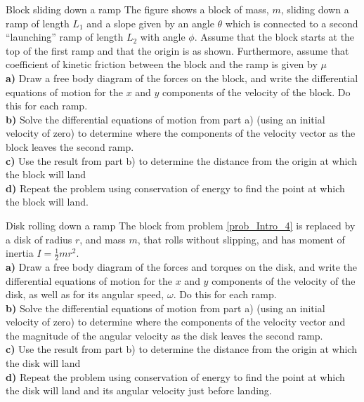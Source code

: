 \begin{problem}{Block sliding down a ramp}
\label{prob_Intro_3}
The figure shows a block of mass, $m$, sliding down a ramp of length $L_1$ and a slope given by an angle $\theta$ which is connected to a second ``launching'' ramp of length $L_2$ with angle $\phi$. Assume that the block starts at the top of the first ramp and that the origin is as shown. Furthermore, assume that coefficient of kinetic friction between the block and the ramp is given by $\mu$
\\
\textbf{a)} Draw a free body diagram of the forces on the block, and write the differential equations of motion for the $x$ and $y$ components of the velocity of the block. Do this for each ramp.\\
\textbf{b)} Solve the differential equations of motion from part a) (using an initial velocity of zero) to determine where the components of the velocity vector as the block leaves the second ramp.\\
\textbf{c)} Use the result from part b) to determine the distance from the origin at which the block will land\\
\textbf{d)} Repeat the problem using conservation of energy to find the point at which the block will land.
\end{problem}
%
\begin{problem}{Disk rolling down a ramp}
\label{prob_Intro_4}
The block from problem \ref{prob_Intro_4} is replaced by a disk of radius $r$, and mass $m$, that rolls without slipping, and has moment of inertia $I=\frac{1}{2}mr^2$.\\
\textbf{a)} Draw a free body diagram of the forces and torques on the disk, and write the differential equations of motion for the $x$ and $y$ components of the velocity of the disk, as well as for its angular speed, $\omega$. Do this for each ramp.\\
\textbf{b)} Solve the differential equations of motion from part a) (using an initial velocity of zero) to determine where the components of the velocity vector and the magnitude of the angular velocity as the disk leaves the second ramp.\\
\textbf{c)} Use the result from part b) to determine the distance from the origin at which the disk will land\\
\textbf{d)} Repeat the problem using conservation of energy to find the point at which the disk will land and its angular velocity just before landing.
\end{problem}
